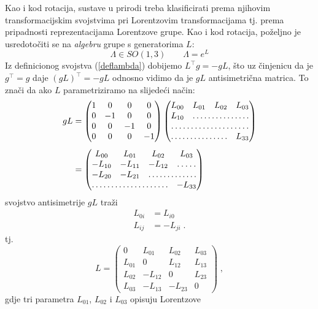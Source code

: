 \label{id:5}
Kao i kod rotacija, sustave u prirodi treba klasificirati prema
njihovim transformacijskim svojstvima pri Lorentzovim transformacijama
tj. prema pripadnosti reprezentacijama Lorentzove
grupe. Kao i kod rotacija, poželjno je usredotočiti se na \emph{algebru}
grupe s generatorima $L$:
\begin{equation}
 \Lambda \in SO(1,3) \qquad \Lambda= e^L
\end{equation}
Iz definicionog svojstva (\ref{deflambda}) dobijemo $L^\top g = -g L$,
što uz činjenicu da je $g^\top = g$ daje $(gL)^\top = -gL$ odnosno
vidimo da je $gL$ antisimetrična matrica. To znači da ako $L$
parametriziramo na slijedeći način:
\begin{align}
 gL &= 
\begin{pmatrix}
1 & 0 & 0 & 0 \\
0 &-1 & 0 & 0 \\
0 & 0 &-1 & 0 \\
0 & 0 & 0 &-1
\end{pmatrix}
\begin{pmatrix}
L_{00} & L_{01} & L_{02} & L_{03}\\
L_{10} &\hdotsfor{3} \\
\hdotsfor{4} \\
\hdotsfor{3} & L_{33}
\end{pmatrix} \\[1ex]
&= 
\begin{pmatrix}
L_{00} & L_{01} & L_{02} & L_{03}\\
-L_{10} & -L_{11} & -L_{12} &\hdotsfor{1} \\
-L_{20} & -L_{21} & \hdotsfor{2} \\
\hdotsfor{3} & -L_{33}
\end{pmatrix}
\end{align}
svojstvo antisimetrije $gL$ traži
\begin{align}
L_{0i} &= L_{i0} \\
L_{ij} &= - L_{ji} \;.
\end{align}
tj.
\begin{equation}
 L = \begin{pmatrix}
0 & L_{01} & L_{02} & L_{03}\\
L_{01} & 0 & L_{12} & L_{13}\\
L_{02} & -L_{12} & 0& L_{23} \\
L_{03} & -L_{13} &-L_{23} & 0
\end{pmatrix} \;,
\end{equation}
gdje tri parametra $L_{01}$, $L_{02}$ i $L_{03}$ opisuju Lorentzove

